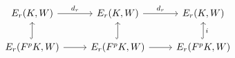 \documentclass[crop,dvisvgm]{standalone}
\begin{document}
\[\begin {tikzcd}
        E_r(K,W)
          \ar [r,"d_r"]
        & E_r(K,W)
          \ar [r,"d_r"]
        & E_r(K,W)
      \\E_r(F^pK,W)
          \ar [r]
          \ar [u,hook]
        & E_r(F^pK,W)
          \ar [r]
          \ar [u,hook]
        & E_r(F^pK,W)
          \ar [u,hook,swap,"i"]
      \end {tikzcd}\]
\end{document}
